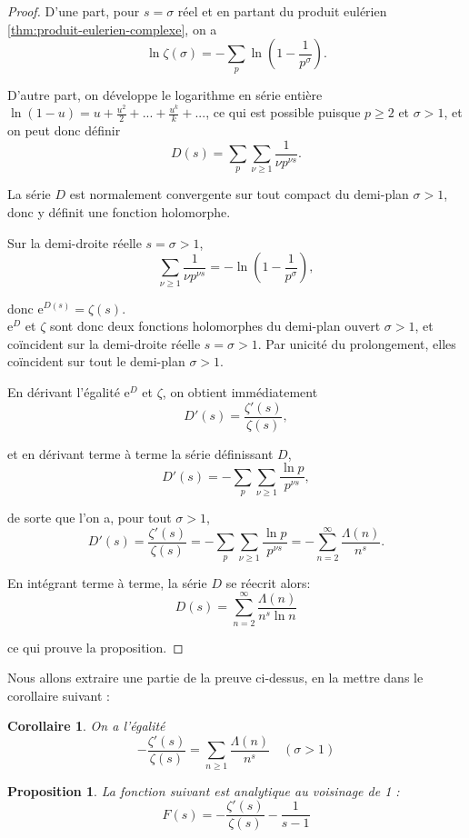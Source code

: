 \documentclass[french]{report}
\newtheorem{proposition}[theorem]{Proposition}
\newtheorem{corollary}[theorem]{Corollaire}
\begin{document}
\begin{proof}
  D'une part, pour $s=\sigma$ réel et en partant du produit eulérien \ref{thm:produit-eulerien-complexe}, on a
  \[ \ln\zeta(\sigma) = -\sum_p\ln\left(1-\frac{1}{p^\sigma}\right). \]

  D'autre part, on développe le logarithme en série entière $\ln(1-u)=u+\frac{u^2}{2}+...+\frac{u^k}{k}+...$, ce qui est possible puisque $p\geq2$ et $\sigma>1$, et on peut donc définir
  \[ D(s) = \sum_p\sum_{\nu\geq1}\frac{1}{\nu p^{\nu s}}. \]
  
  La série $D$ est normalement convergente sur tout compact du demi-plan $\sigma>1$, donc y définit une fonction holomorphe.

  Sur la demi-droite réelle $s=\sigma>1$,
  \[ \sum_{\nu\geq1}\frac{1}{\nu p^{\nu s}} = -\ln\left(1-\frac{1}{p^\sigma}\right), \]

  donc $\mathrm{e}^{D(s)}=\zeta(s)$.
  \\
  
  $\mathrm{e}^D$ et $\zeta$ sont donc deux fonctions holomorphes du demi-plan ouvert $\sigma>1$, et coïncident sur la demi-droite réelle $s=\sigma>1$. Par unicité du prolongement, elles coïncident sur tout le demi-plan $\sigma>1$.

  En dérivant l'égalité $\mathrm{e}^D$ et $\zeta$, on obtient immédiatement
  \[ D'(s)=\frac{\zeta'(s)}{\zeta(s)}, \]
  
  et en dérivant terme à terme la série définissant $D$, 
  \[ D'(s) = -\sum_p\sum_{\nu\geq1}\frac{\ln p}{p^{\nu s}}, \]

  de sorte que l'on a, pour tout $\sigma>1$,
  \[
    D'(s)
    = \frac{\zeta'(s)}{\zeta(s)}
    = -\sum_p\sum_{\nu\geq1}\frac{\ln p}{p^{\nu s}}
    = -\sum_{n=2}^\infty\frac{\Lambda(n)}{n^s}.
  \]

  En intégrant terme à terme, la série $D$ se réecrit alors:
  \[ D(s) = \sum_{n=2}^\infty\frac{\Lambda(n)}{n^s\ln n} \]

  ce qui prouve la proposition.
\end{proof}

Nous allons extraire une partie de la preuve ci-dessus, en la mettre dans le corollaire suivant :

\begin{corollary}\label{cor:zeta-zeta-prime-van-mangoldt}
  On a l'égalité
  \[ -\frac{\zeta'(s)}{\zeta(s)} = \sum_{n\geq1}\frac{\Lambda(n)}{n^s}\quad(\sigma>1) \]
\end{corollary}

\begin{proposition}\label{prop:zeta-sur-zeta-prime-1-sur-holomorphe}
  La fonction suivant est analytique au voisinage de 1 :
  \[ F(s) = - \frac{\zeta'(s)}{\zeta(s)} - \frac{1}{s-1} \]
\end{proposition}
\end{document}

